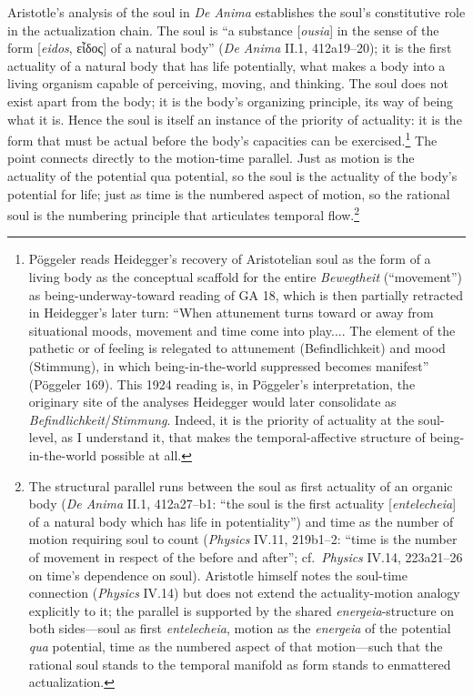 \documentclass{article}
\newcommand{\gk}[1]{{\greekfont #1}}
\begin{document}
Aristotle's analysis of the soul in \textit{De Anima} establishes the soul's constitutive role in the actualization chain. The soul is ``a substance [\textit{ousia}] in the sense of the form [\textit{eidos}, \gk{εἶδος}] of a natural body'' (\textit{De Anima} II.1, 412a19--20); it is the first actuality of a natural body that has life potentially, what makes a body into a living organism capable of perceiving, moving, and thinking. The soul does not exist apart from the body; it is the body's organizing principle, its way of being what it is. Hence the soul is itself an instance of the priority of actuality: it is the form that must be actual before the body's capacities can be exercised.\footnote{Pöggeler reads Heidegger's recovery of Aristotelian soul as the form of a living body as the conceptual scaffold for the entire \textit{Bewegtheit} (``movement'') as being-underway-toward reading of GA 18, which is then partially retracted in Heidegger's later turn: ``When attunement turns toward or away from situational moods, movement and time come into play.... The element of the pathetic or of feeling is relegated to attunement (Befindlichkeit) and mood (Stimmung), in which being-in-the-world suppressed becomes manifest'' (Pöggeler 169). This 1924 reading is, in Pöggeler's interpretation, the originary site of the analyses Heidegger would later consolidate as \textit{Befindlichkeit}/\textit{Stimmung}. Indeed, it is the priority of actuality at the soul-level, as I understand it, that makes the temporal-affective structure of being-in-the-world possible at all.} The point connects directly to the motion-time parallel. Just as motion is the actuality of the potential qua potential, so the soul is the actuality of the body's potential for life; just as time is the numbered aspect of motion, so the rational soul is the numbering principle that articulates temporal flow.\footnote{The structural parallel runs between the soul as first actuality of an organic body (\textit{De Anima} II.1, 412a27--b1: ``the soul is the first actuality [\textit{entelecheia}] of a natural body which has life in potentiality'') and time as the number of motion requiring soul to count (\textit{Physics} IV.11, 219b1--2: ``time is the number of movement in respect of the before and after''; cf.\ \textit{Physics} IV.14, 223a21--26 on time's dependence on soul). Aristotle himself notes the soul-time connection (\textit{Physics} IV.14) but does not extend the actuality-motion analogy explicitly to it; the parallel is supported by the shared \textit{energeia}-structure on both sides---soul as first \textit{entelecheia}, motion as the \textit{energeia} of the potential \textit{qua} potential, time as the numbered aspect of that motion---such that the rational soul stands to the temporal manifold as form stands to enmattered actualization.}
\end{document}
